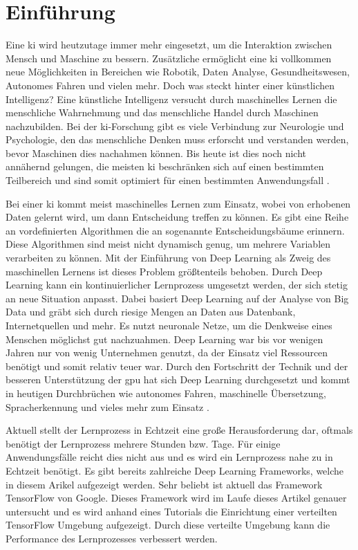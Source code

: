 \section{Einführung}
Eine \ac{ki} wird heutzutage immer mehr eingesetzt, um die Interaktion zwischen Mensch und Maschine zu bessern. Zusätzliche ermöglicht eine \ac{ki} vollkommen neue Möglichkeiten in Bereichen wie Robotik, Daten Analyse, Gesundheitswesen, Autonomes Fahren und vielen mehr. Doch was steckt hinter einer künstlichen Intelligenz? Eine künstliche Intelligenz versucht durch maschinelles Lernen die menschliche Wahrnehmung und das menschliche Handel durch Maschinen nachzubilden. Bei der \ac{ki}-Forschung gibt es viele Verbindung zur Neurologie und Psychologie, den das menschliche Denken muss erforscht und verstanden werden, bevor Maschinen dies nachahmen können. Bis heute ist dies noch nicht annähernd gelungen, die meisten \ac{ki} beschränken sich auf einen bestimmten Teilbereich und sind somit optimiert für einen bestimmten Anwendungsfall \cite{PlanetWissenKI}. \newline

Bei einer \ac{ki} kommt meist maschinelles Lernen zum Einsatz, wobei von erhobenen Daten gelernt wird, um dann Entscheidung treffen zu können. Es gibt eine Reihe an vordefinierten Algorithmen die an sogenannte Entscheidungsbäume erinnern. Diese Algorithmen sind meist nicht dynamisch genug, um mehrere Variablen verarbeiten zu können. Mit der Einführung von Deep Learning als Zweig des maschinellen Lernens ist dieses Problem größtenteils behoben. Durch Deep Learning kann ein kontinuierlicher Lernprozess umgesetzt werden, der sich stetig an neue Situation anpasst. Dabei basiert Deep Learning auf der Analyse von Big Data und gräbt sich durch riesige Mengen an Daten aus Datenbank, Internetquellen und mehr. Es nutzt neuronale Netze, um die Denkweise eines Menschen möglichst gut nachzuahmen. Deep Learning war bis vor wenigen Jahren nur von wenig Unternehmen genutzt, da der Einsatz viel Ressourcen benötigt und somit relativ teuer war. Durch den Fortschritt der Technik und der besseren Unterstützung der \ac{gpu} hat sich Deep Learning durchgesetzt und kommt in heutigen Durchbrüchen wie autonomes Fahren, maschinelle Übersetzung, Spracherkennung und vieles mehr zum Einsatz \cite{BigDataInsiderDeepLearning}. \newline

Aktuell stellt der Lernprozess in Echtzeit eine große Herausforderung dar, oftmals benötigt der Lernprozess mehrere Stunden bzw. Tage. Für einige Anwendungsfälle reicht dies nicht aus und es wird ein Lernprozess nahe zu in Echtzeit benötigt. Es gibt bereits zahlreiche Deep Learning Frameworks, welche in diesem Arikel aufgezeigt werden. Sehr beliebt ist aktuell das Framework TensorFlow von Google. Dieses Framework wird im Laufe dieses Artikel genauer untersucht und es wird anhand eines Tutorials die Einrichtung einer verteilten TensorFlow Umgebung aufgezeigt. Durch diese verteilte Umgebung kann die Performance des Lernprozesses verbessert werden.  
